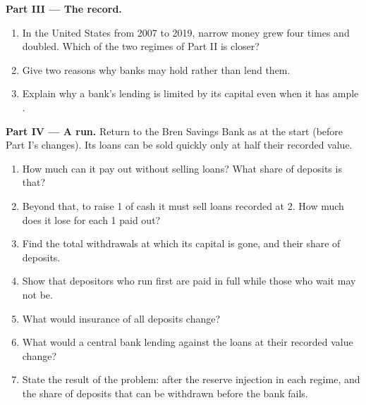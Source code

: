 \begin{problem}
\medskip
\noindent\textbf{Part III --- The record.}
\begin{enumerate}[resume]
\item In the United States from 2007 to 2019, narrow money grew four times and  doubled. Which of the two regimes of Part II is closer?
\item Give two reasons why banks may hold  rather than lend them.
\item Explain why a bank's lending is limited by its capital even when it has ample .
\end{enumerate}

\medskip
\noindent\textbf{Part IV --- A run.}
Return to the Bren Savings Bank as at the start (before Part I's changes). Its loans can be sold quickly only at half their recorded value.
\begin{enumerate}[resume]
\item How much can it pay out without selling loans? What share of deposits is that?
\item Beyond that, to raise 1 of cash it must sell loans recorded at 2. How much does it lose for each 1 paid out?
\item Find the total withdrawals at which its capital is gone, and their share of deposits.
\item Show that depositors who run first are paid in full while those who wait may not be.
\item What would insurance of all deposits change?
\item What would a central bank lending against the loans at their recorded value change?
\item State the result of the problem:  after the reserve injection in each regime, and the share of deposits that can be withdrawn before the bank fails.
\end{enumerate}
\end{problem}
